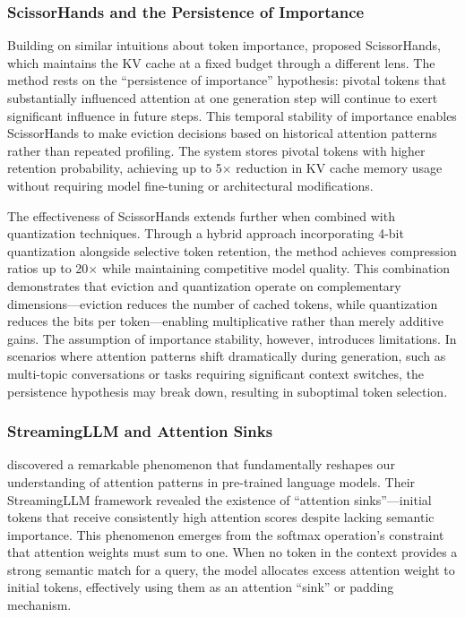 \subsubsection{ScissorHands and the Persistence of Importance}

Building on similar intuitions about token importance, \citet{liu2023scissorhands} proposed ScissorHands, which maintains the KV cache at a fixed budget through a different lens. The method rests on the ``persistence of importance'' hypothesis: pivotal tokens that substantially influenced attention at one generation step will continue to exert significant influence in future steps. This temporal stability of importance enables ScissorHands to make eviction decisions based on historical attention patterns rather than repeated profiling. The system stores pivotal tokens with higher retention probability, achieving up to 5$\times$ reduction in KV cache memory usage without requiring model fine-tuning or architectural modifications.

The effectiveness of ScissorHands extends further when combined with quantization techniques. Through a hybrid approach incorporating 4-bit quantization alongside selective token retention, the method achieves compression ratios up to 20$\times$ while maintaining competitive model quality. This combination demonstrates that eviction and quantization operate on complementary dimensions---eviction reduces the number of cached tokens, while quantization reduces the bits per token---enabling multiplicative rather than merely additive gains. The assumption of importance stability, however, introduces limitations. In scenarios where attention patterns shift dramatically during generation, such as multi-topic conversations or tasks requiring significant context switches, the persistence hypothesis may break down, resulting in suboptimal token selection.

\subsubsection{StreamingLLM and Attention Sinks}

\citet{xiao2024streamingllm} discovered a remarkable phenomenon that fundamentally reshapes our understanding of attention patterns in pre-trained language models. Their StreamingLLM framework revealed the existence of ``attention sinks''---initial tokens that receive consistently high attention scores despite lacking semantic importance. This phenomenon emerges from the softmax operation's constraint that attention weights must sum to one. When no token in the context provides a strong semantic match for a query, the model allocates excess attention weight to initial tokens, effectively using them as an attention ``sink'' or padding mechanism.

